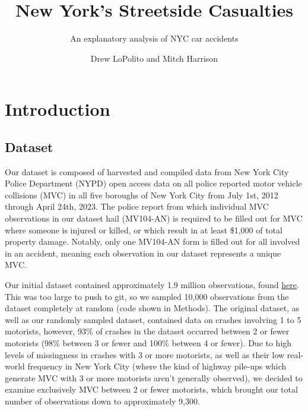 \documentclass[
  letterpaper,
  DIV=11,
  numbers=noendperiod]{scrartcl}
\title{New York's Streetside Casualties}
\subtitle{An explanatory analysis of NYC car accidents}
\author{Drew LoPolito and Mitch Harrison}
\date{}
\begin{document}
\maketitle
\ifdefined\Shaded\renewenvironment{Shaded}{\begin{tcolorbox}[borderline west={3pt}{0pt}{shadecolor}, sharp corners, interior hidden, enhanced, frame hidden, breakable, boxrule=0pt]}{\end{tcolorbox}}\fi

\hypertarget{introduction}{%
\section{Introduction}\label{introduction}}

\hypertarget{dataset}{%
\subsection{Dataset}\label{dataset}}

Our dataset is composed of harvested and compiled data from New York
City Police Department (NYPD) open access data on all police reported
motor vehicle collisions (MVC) in all five boroughs of New York City
from July 1st, 2012 through April 24th, 2023. The police report from
which individual MVC observations in our dataset hail (MV104-AN) is
required to be filled out for MVC where someone is injured or killed, or
which result in at least \$1,000 of total property damage. Notably, only
one MV104-AN form is filled out for all involved in an accident, meaning
each observation in our dataset represents a unique MVC.

Our initial dataset contained approximately 1.9 million observations,
found
\href{https://www.kaggle.com/datasets/utkarshx27/motor-vehicle-collisions?resource=download}{here}.
This was too large to push to git, so we sampled 10,000 observations
from the dataset completely at random (code shown in Methods). The
original dataset, as well as our randomly sampled dataset, contained
data on crashes involving 1 to 5 motorists, however, 93\% of crashes in
the dataset occurred between 2 or fewer motorists (98\% between 3 or
fewer and 100\% between 4 or fewer). Due to high levels of missingness
in crashes with 3 or more motorists, as well as their low real-world
frequency in New York City (where the kind of highway pile-ups which
generate MVC with 3 or more motorists aren't generally observed), we
decided to examine exclusively MVC between 2 or fewer motorists, which
brought our total number of observations down to approximately 9,300.
\end{document}
